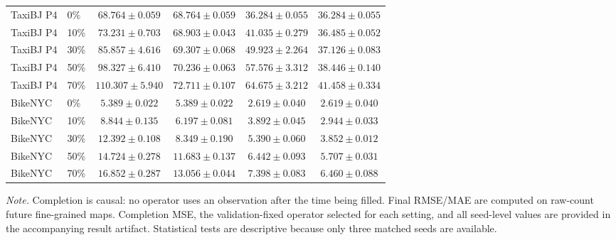 \begin{table}[!htbp]
\begin{tabular}{llcccc}
\addlinespace
TaxiBJ P4 & 0\% & $68.764\pm0.059$ & $68.764\pm0.059$ & $36.284\pm0.055$ & $36.284\pm0.055$ \\
TaxiBJ P4 & 10\% & $73.231\pm0.703$ & $68.903\pm0.043$ & $41.035\pm0.279$ & $36.485\pm0.052$ \\
TaxiBJ P4 & 30\% & $85.857\pm4.616$ & $69.307\pm0.068$ & $49.923\pm2.264$ & $37.126\pm0.083$ \\
TaxiBJ P4 & 50\% & $98.327\pm6.410$ & $70.236\pm0.063$ & $57.576\pm3.312$ & $38.446\pm0.140$ \\
TaxiBJ P4 & 70\% & $110.307\pm5.940$ & $72.711\pm0.107$ & $64.675\pm3.212$ & $41.458\pm0.334$ \\
\addlinespace
BikeNYC & 0\% & $5.389\pm0.022$ & $5.389\pm0.022$ & $2.619\pm0.040$ & $2.619\pm0.040$ \\
BikeNYC & 10\% & $8.844\pm0.135$ & $6.197\pm0.081$ & $3.892\pm0.045$ & $2.944\pm0.033$ \\
BikeNYC & 30\% & $12.392\pm0.108$ & $8.349\pm0.190$ & $5.390\pm0.060$ & $3.852\pm0.012$ \\
BikeNYC & 50\% & $14.724\pm0.278$ & $11.683\pm0.137$ & $6.442\pm0.093$ & $5.707\pm0.031$ \\
BikeNYC & 70\% & $16.852\pm0.287$ & $13.056\pm0.044$ & $7.398\pm0.083$ & $6.460\pm0.088$ \\
\bottomrule
\end{tabular}
\parbox{\textwidth}{\footnotesize\textit{Note.} Completion is causal: no operator uses an observation after the time being filled. Final RMSE/MAE are computed on raw-count future fine-grained maps. Completion MSE, the validation-fixed operator selected for each setting, and all seed-level values are provided in the accompanying result artifact. Statistical tests are descriptive because only three matched seeds are available.}
\end{table}
